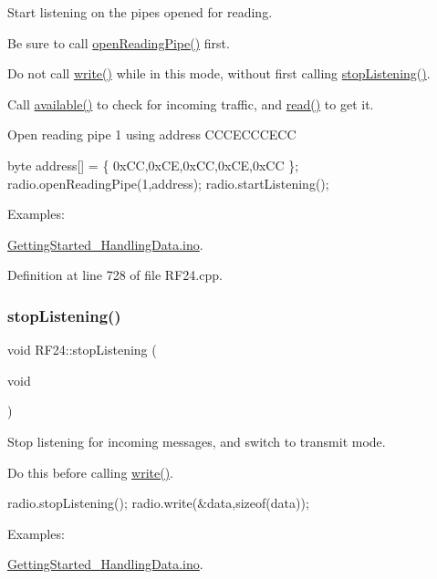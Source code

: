 Start listening on the pipes opened for reading.


\begin{DoxyEnumerate}
\item Be sure to call \hyperlink{classRF24_a9edc910ccc1ffcff56814b08faca5535}{open\+Reading\+Pipe()} first.
\item Do not call \hyperlink{classRF24_a4cd4c198a47704db20b6b5cf0731cd58}{write()} while in this mode, without first calling \hyperlink{classRF24_a6f144d73fc447c8ac2d1a4166210fd88}{stop\+Listening()}.
\item Call \hyperlink{classRF24_a127105eb7a3b351cfe777c1cec50627a}{available()} to check for incoming traffic, and \hyperlink{classRF24_a8e2eacacfba96426c192066f04054c5b}{read()} to get it.
\end{DoxyEnumerate}


\begin{DoxyCode}
Open reading pipe 1 \textcolor{keyword}{using} address CCCECCCECC
 
byte address[] = \{ 0xCC,0xCE,0xCC,0xCE,0xCC \};
radio.openReadingPipe(1,address);
radio.startListening();
\end{DoxyCode}
 \begin{Desc}
\item[Examples\+: ]\par
\hyperlink{GettingStarted_HandlingData_8ino-example}{Getting\+Started\+\_\+\+Handling\+Data.\+ino}.\end{Desc}


Definition at line 728 of file R\+F24.\+cpp.

\mbox{\label{classRF24_a6f144d73fc447c8ac2d1a4166210fd88}} 
\subsubsection{\texorpdfstring{stop\+Listening()}{stopListening()}}
{\footnotesize\ttfamily void R\+F24\+::stop\+Listening (\begin{DoxyParamCaption}\item[{void}]{ }\end{DoxyParamCaption})}

Stop listening for incoming messages, and switch to transmit mode.

Do this before calling \hyperlink{classRF24_a4cd4c198a47704db20b6b5cf0731cd58}{write()}. 
\begin{DoxyCode}
radio.stopListening();
radio.write(&data,\textcolor{keyword}{sizeof}(data));
\end{DoxyCode}
 \begin{Desc}
\item[Examples\+: ]\par
\hyperlink{GettingStarted_HandlingData_8ino-example}{Getting\+Started\+\_\+\+Handling\+Data.\+ino}.\end{Desc}


